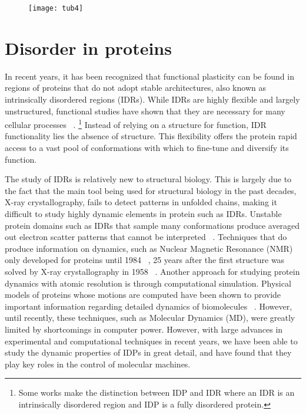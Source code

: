 \begin{figure}[h!]
\centering
\texttt{[image: tub4]}
\label{fig:tub4}
\end{figure}

\section{Disorder in proteins}

In recent years, it has been recognized that functional plasticity  can be found in regions of proteins that  do not adopt stable architectures, also known as intrinsically disordered regions (IDRs). While IDRs are highly flexible and largely unstructured, functional studies have shown that they are necessary for many cellular processes ~\cite{wright2015intrinsically}.  \footnote{Some works make the distinction between IDP and IDR where an IDR is an intrinsically disordered region and IDP is a fully disordered protein.} Instead of relying on a structure for function, IDR functionality lies the absence of structure. This flexibility offers the protein rapid access to a vast pool of conformations with which to fine-tune and diversify its function.  

The study of IDRs is relatively new to structural biology. This is largely due to the fact that the main tool being used for structural biology in the past decades, X-ray crystallography, fails to detect patterns in unfolded chains, making it difficult to study highly dynamic elements in protein such as IDRs. Unstable protein domains such as IDRs that sample many conformations produce averaged out electron scatter patterns that cannot be interpreted ~\cite{putnam2007x}. Techniques that  do produce information  on dynamics,  such as Nuclear Magnetic Resonance (NMR) only developed for proteins  until 1984 ~\cite{wuthrich2001way}, 25 years after the first structure was solved by X-ray crystallography  in 1958 ~\cite{kendrew1958three}.  Another approach for studying protein dynamics with atomic resolution is through computational simulation.  Physical models of proteins whose motions are computed \silico have been shown to provide important information regarding detailed dynamics of biomolecules ~\cite{karplus2002molecular}. However, until recently, these techniques, such as Molecular Dynamics (MD), were greatly limited by shortcomings in computer power. However, with large advances  in experimental  and computational techniques  in recent years, we have been able to study the dynamic properties  of IDPs in great detail, and have found that  they play key roles in the control of molecular machines.

